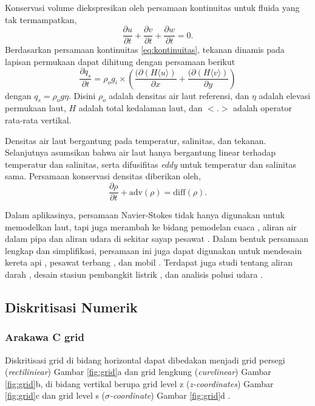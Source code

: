 \begin{spacing}{1.5}
	Konservasi volume diekspresikan oleh persamaan kontinuitas untuk fluida yang tak termampatkan,
	\begin{equation}\label{eq:kontinuitas}
		\frac{\partial u}{\partial t} + \frac{\partial v}{\partial t} + \frac{\partial w}{\partial t} = 0.
	\end{equation}
	Berdasarkan persamaan kontinuitas \ref{eq:kontinuitas}, tekanan dinamis pada lapisan permukaan dapat dihitung dengan persamaan berikut
	\begin{equation}\label{eq:tekanan}
		\frac{\partial q_s}{\partial t} = \rho_o g_i \times \left( \frac{(\partial \left(H \langle u \rangle \right)} {\partial x} + \frac{(\partial \left(H \langle v \rangle \right)} {\partial y}\right)
	\end{equation}
	dengan $q_s = \rho_o g \eta$. Disini $\rho_o$ adalah densitas air laut referensi, dan $\eta$ adalah elevasi permukaan laut, $H$ adalah total kedalaman laut, dan $<.>$ adalah operator rata-rata vertikal.
	\par Densitas air laut bergantung pada temperatur, salinitas, dan tekanan. Selanjutnya asumsikan bahwa air laut hanya bergantung linear terhadap temperatur dan salinitas, serta difusifitas \textit{eddy} untuk temperatur dan salinitas sama. Persamaan konservasi densitas diberikan oleh,
	\begin{equation}
		\frac{\partial \rho}{\partial t} + \text{adv}(\rho) = \text{diff}(\rho).
	\end{equation}
	
	Dalam aplikasinya, persamaan Navier-Stokes tidak hanya digunakan untuk memodelkan laut, tapi juga merambah ke bidang pemodelan cuaca , aliran air dalam pipa  dan aliran udara di sekitar sayap pesawat . Dalam bentuk persamaan lengkap dan simplifikasi, persamaan ini juga dapat digunakan untuk mendesain kereta api , pesawat terbang , dan mobil . Terdapat juga studi tentang aliran darah , desain stasiun pembangkit listrik , dan analisis polusi udara . 

\subsection[Diskritisasi Numerik]{Diskritisasi Numerik}
\subsubsection[Arakawa C grid]{Arakawa C grid}
	Diskritisasi grid di bidang horizontal dapat dibedakan menjadi grid persegi (\textit{rectiliniear}) Gambar \ref{fig:grid}a dan grid lengkung (\textit{curvlinear}) Gambar \ref{fig:grid}b, di bidang vertikal berupa grid level z (\textit{z-coordinates}) Gambar \ref{fig:grid}c dan grid level s (\textit{$\sigma$-coordinate}) Gambar \ref{fig:grid}d .
	

\end{spacing}
